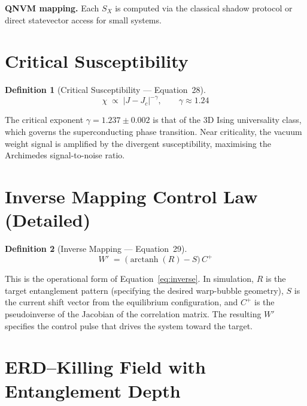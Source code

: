 \documentclass[11pt,a4paper]{article}
\newtheorem{definition}{Definition}[section]
\theoremstyle{remark}
\DeclareMathOperator{\arctanh}{arctanh}
\begin{document}
\textbf{QNVM mapping.}\quad
Each $S_X$ is computed via the classical shadow protocol or direct statevector access for small systems.

\section{Critical Susceptibility}
\label{sec:eq28}

\begin{definition}[Critical Susceptibility --- Equation~28]
\begin{equation}\label{eq:suscept}
    \chi \;\propto\; |J - J_c|^{-\gamma}, \qquad \gamma \approx 1.24
\end{equation}
\end{definition}

The critical exponent $\gamma = 1.237 \pm 0.002$ is that of the 3D Ising universality class, which governs the superconducting phase transition.  Near criticality, the vacuum weight signal is amplified by the divergent susceptibility, maximising the Archimedes signal-to-noise ratio.

\section{Inverse Mapping Control Law (Detailed)}
\label{sec:eq29}

\begin{definition}[Inverse Mapping --- Equation~29]
\begin{equation}\label{eq:invmap}
    W' \;=\; \bigl(\arctanh(R) - S\bigr)\,C^{+}
\end{equation}
\end{definition}

This is the operational form of Equation~\eqref{eq:inverse}.  In simulation, $R$ is the target entanglement pattern (specifying the desired warp-bubble geometry), $S$ is the current shift vector from the equilibrium configuration, and $C^{+}$ is the pseudoinverse of the Jacobian of the correlation matrix.  The resulting $W'$ specifies the control pulse that drives the system toward the target.

\section{ERD--Killing Field with Entanglement Depth}
\label{sec:eq30}
\end{document}

